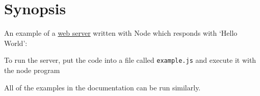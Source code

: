 \section{Synopsis}\label{synopsis}

An example of a \href{http.html}{web server} written with Node which
responds with `Hello World':

\begin{Shaded}
\begin{Highlighting}[]
 \NormalTok{(}\NormalTok{);}

\NormalTok{(} 
  \NormalTok{(}\NormalTok{, \{}\NormalTok{: }\NormalTok{\});}
  \NormalTok{(}\NormalTok{);}
\NormalTok{(}\NormalTok{);}

\NormalTok{(}\NormalTok{);}
\end{Highlighting}
\end{Shaded}

To run the server, put the code into a file called \texttt{example.js}
and execute it with the node program

\begin{Shaded}
\begin{Highlighting}[]
\end{Highlighting}
\end{Shaded}

All of the examples in the documentation can be run similarly.
